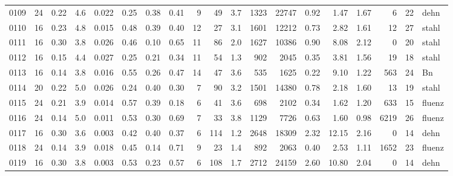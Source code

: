 {\begin{longtable}{@{}lrrrrrrrrrrrrrrrrrl@{}}
0109 & 24 & \num{0.22} & \num{4.6} & \num{0.022} & \num{0.25} & \num{0.38} & \num{0.41} & 9 & \num{49} & \num{3.7} & \num{1323} & \num{22747} & \num{0.92} & \num{1.47} & \num{1.67} & \num{6} & \num{22} & dehn \\
0110 & 16 & \num{0.23} & \num{4.8} & \num{0.015} & \num{0.48} & \num{0.39} & \num{0.40} & 12 & \num{27} & \num{3.1} & \num{1601} & \num{12212} & \num{0.73} & \num{2.82} & \num{1.61} & \num{12} & \num{27} & stahl \\
0111 & 16 & \num{0.30} & \num{3.8} & \num{0.026} & \num{0.46} & \num{0.10} & \num{0.65} & 11 & \num{86} & \num{2.0} & \num{1627} & \num{10386} & \num{0.90} & \num{8.08} & \num{2.12} & \num{0} & \num{20} & stahl \\
0112 & 16 & \num{0.15} & \num{4.4} & \num{0.027} & \num{0.25} & \num{0.21} & \num{0.34} & 11 & \num{54} & \num{1.3} & \num{902} & \num{2045} & \num{0.35} & \num{3.81} & \num{1.56} & \num{19} & \num{18} & stahl \\
0113 & 16 & \num{0.14} & \num{3.8} & \num{0.016} & \num{0.55} & \num{0.26} & \num{0.47} & 14 & \num{47} & \num{3.6} & \num{535} & \num{1625} & \num{0.22} & \num{9.10} & \num{1.22} & \num{563} & \num{24} & Bn \\
0114 & 20 & \num{0.22} & \num{5.0} & \num{0.026} & \num{0.24} & \num{0.40} & \num{0.30} & 7 & \num{90} & \num{3.2} & \num{1501} & \num{14380} & \num{0.78} & \num{2.18} & \num{1.60} & \num{13} & \num{19} & stahl \\
0115 & 24 & \num{0.21} & \num{3.9} & \num{0.014} & \num{0.57} & \num{0.39} & \num{0.18} & 6 & \num{41} & \num{3.6} & \num{698} & \num{2102} & \num{0.34} & \num{1.62} & \num{1.20} & \num{633} & \num{15} & fluenz \\
0116 & 24 & \num{0.14} & \num{5.0} & \num{0.011} & \num{0.53} & \num{0.30} & \num{0.69} & 7 & \num{33} & \num{3.8} & \num{1129} & \num{7726} & \num{0.63} & \num{1.60} & \num{0.98} & \num{6219} & \num{26} & fluenz \\
0117 & 16 & \num{0.30} & \num{3.6} & \num{0.003} & \num{0.42} & \num{0.40} & \num{0.37} & 6 & \num{114} & \num{1.2} & \num{2648} & \num{18309} & \num{2.32} & \num{12.15} & \num{2.16} & \num{0} & \num{14} & dehn \\
0118 & 24 & \num{0.14} & \num{3.9} & \num{0.018} & \num{0.45} & \num{0.14} & \num{0.71} & 9 & \num{23} & \num{1.4} & \num{892} & \num{2063} & \num{0.40} & \num{2.53} & \num{1.11} & \num{1652} & \num{23} & fluenz \\
0119 & 16 & \num{0.30} & \num{3.8} & \num{0.003} & \num{0.53} & \num{0.23} & \num{0.57} & 6 & \num{108} & \num{1.7} & \num{2712} & \num{24159} & \num{2.60} & \num{10.80} & \num{2.04} & \num{0} & \num{14} & dehn \\

\end{longtable}}
